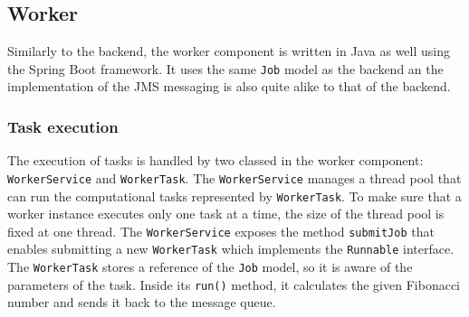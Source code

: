 \subsection{Worker}


Similarly to the backend, the worker component is written in Java as well using the Spring Boot framework. It uses the same \texttt{Job} model as the backend an the implementation of the JMS messaging is also quite alike to that of the backend.

\subsubsection{Task execution} \label{impl-worker-task-execution}

The execution of tasks is handled by two classed in the worker component: \texttt{WorkerService} and \texttt{WorkerTask}. The \texttt{WorkerService} manages a thread pool that can run the computational tasks represented by \texttt{WorkerTask}. To make sure that a worker instance executes only one task at a time, the size of the thread pool is fixed at one thread. The \texttt{WorkerService} exposes the method \texttt{submitJob} that enables submitting a new \texttt{WorkerTask} which implements the \texttt{Runnable} interface. The \texttt{WorkerTask} stores a reference of the \texttt{Job} model, so it is aware of the parameters of the task. Inside its \texttt{run()} method, it calculates the given Fibonacci number and sends it back to the message queue.

